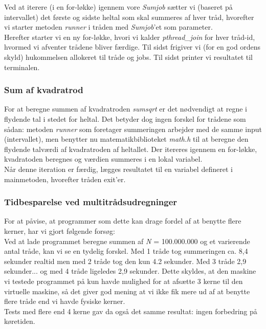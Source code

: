 \documentclass[main.tex]{subfile}
\begin{document}
Ved at iterere (i en for-løkke) igennem vore \textit{Sumjob} sætter vi (baseret på intervallet) det første og sidste heltal som skal summeres af hver tråd, hvorefter vi starter metoden \textit{runner} i tråden med \textit{Sumjob}'et som parameter.\\

Herefter starter vi en ny for-løkke, hvori vi kalder \textit{pthread_join} for hver tråd-id, hvormed vi afventer trådene bliver færdige. Til sidst frigiver vi (for en god ordens skyld) hukommelsen allokeret til tråde og jobs. Til sidst printer vi resultatet til terminalen.

\subsubsection{Sum af kvadratrod}
For at beregne summen af kvadratroden \textit{sumsqrt} er det nødvendigt at regne i flydende tal i stedet for heltal. Det betyder dog ingen forskel for trådene som sådan: metoden \textit{runner} som foretager summeringen arbejder med de samme input (intervallet), men benytter nu matematikbiblioteket \textit{math.h} til at beregne den flydende talværdi af kvadratroden af heltallet. Der itereres igennem en for-løkke, kvadratoden beregnes og værdien summeres i en lokal variabel.\\

Når denne iteration er færdig, lægges resultatet til en variabel defineret i mainmetoden, hvorefter tråden exit'er.

\subsubsection{Tidbesparelse ved multitrådsudregninger}
For at påvise, at programmer som dette kan drage fordel af at benytte flere kerner, har vi gjort følgende forsøg:\\

Ved at lade programmet beregne summen af \textit{N} = 100.000.000 og et varierende antal tråde, kan vi se en tydelig forskel. Med 1 tråde tog summeringen ca. 8,4 sekunder realtid men med 2 tråde tog den kun 4.2 sekunder. Med 3 tråde 2,9 sekunder... og med 4 tråde ligeledes 2,9 sekunder. Dette skyldes, at den maskine vi testede programmet på kun havde mulighed for at afsætte 3 kerne til den virtuelle maskine, så det giver god mening at vi ikke fik mere ud af at benytte flere tråde end vi havde fysiske kerner.\\

Tests med flere end 4 kerne gav da også det samme resultat: ingen forbedring på køretiden.\\
\end{document}

